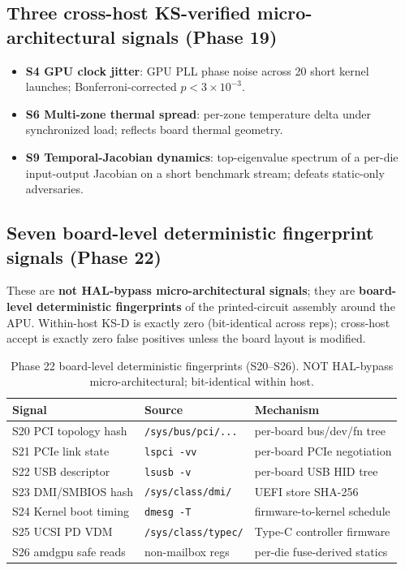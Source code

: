 \documentclass[11pt,letterpaper]{article}
\begin{document}
\subsection{Three cross-host KS-verified micro-architectural signals (Phase 19)}
\begin{itemize}[noitemsep,topsep=2pt]
\item \textbf{S4 GPU clock jitter}: GPU PLL phase noise across 20 short
      kernel launches; Bonferroni-corrected $p < 3{\times}10^{-3}$.
\item \textbf{S6 Multi-zone thermal spread}: per-zone temperature
      delta under synchronized load; reflects board thermal geometry.
\item \textbf{S9 Temporal-Jacobian dynamics}: top-eigenvalue spectrum
      of a per-die input-output Jacobian on a short benchmark stream;
      defeats static-only adversaries.
\end{itemize}

\subsection{Seven board-level deterministic fingerprint signals (Phase 22)}
\label{sec:phase22}
These are \textbf{not HAL-bypass micro-architectural signals}; they are
\textbf{board-level deterministic fingerprints} of the printed-circuit
assembly around the APU. Within-host KS-D is exactly zero
(bit-identical across reps); cross-host accept is exactly zero false
positives unless the board layout is modified.

\begin{table}[h]
\centering\small
\begin{tabular}{lll}
\toprule
Signal & Source & Mechanism \\
\midrule
S20 PCI topology hash & \texttt{/sys/bus/pci/...} & per-board bus/dev/fn tree \\
S21 PCIe link state   & \texttt{lspci -vv}        & per-board PCIe negotiation \\
S22 USB descriptor    & \texttt{lsusb -v}         & per-board USB HID tree \\
S23 DMI/SMBIOS hash   & \texttt{/sys/class/dmi/} & UEFI store SHA-256 \\
S24 Kernel boot timing& \texttt{dmesg -T}         & firmware-to-kernel schedule \\
S25 UCSI PD VDM       & \texttt{/sys/class/typec/}& Type-C controller firmware \\
S26 amdgpu safe reads & non-mailbox regs          & per-die fuse-derived statics \\
\bottomrule
\end{tabular}
\caption{Phase 22 board-level deterministic fingerprints (S20--S26).
NOT HAL-bypass micro-architectural; bit-identical within host.}
\end{table}
\end{document}

